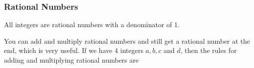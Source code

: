             \subsubsection{  Rational Numbers }
            \nopagebreak
        \label{m38346*id178867}All integers are rational numbers with a denominator of
1. \par 
        \label{m38346*id178879}You can add and multiply rational numbers and still get a rational number at the
end, which is very useful. If we have 4 integers $a,b,c$ and $d$, then the
rules for adding and multiplying rational numbers are
\par 
        \label{m38346*uid61}\nopagebreak\noindent{}
\label{m38346*secfhsst!!!underscore!!!id2239}
